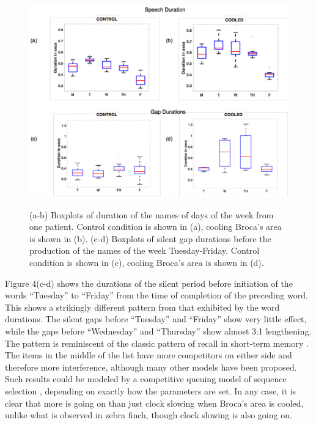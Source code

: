 \documentclass[output=paper,
modfonts
]{LSP/langsci}
\begin{document}
\begin{figure}[htpb]
\includegraphics [width=\linewidth]{durations}
\label{fig:durations}
\caption{(a-b) Boxplots of duration of the names of days of the week from one patient. Control condition is shown in (a), cooling Broca's area is shown in (b).   (c-d) Boxplots of silent gap durations before the production of the names of the week Tuesday-Friday.  Control condition is shown in (c), cooling Broca's area is shown in (d). }
\end{figure}

Figure 4(c-d) shows the durations of the silent period before initiation of the words ``Tuesday'' to ``Friday'' from the time of completion of the preceding word. This shows a strikingly different pattern from that exhibited by the word durations. The silent gaps before ``Tuesday'' and ``Friday'' show very little effect, while the gaps before ``Wednesday'' and ``Thursday'' show almost 3:1 lengthening. The pattern is reminiscent of the classic pattern of recall in short-term memory \citep{Deese1957, Ebb, BrownNeath}. The items in the middle of the list have more competitors on either side and therefore more interference, although many other models have been proposed. Such results could be modeled by a competitive queuing model of sequence selection \citep{Bullock2002}, depending on exactly how the parameters are set. In any case, it is clear that more is going on than just clock slowing when Broca's area is cooled, unlike what is observed in zebra finch, though clock slowing is also going on.
\end{document}
